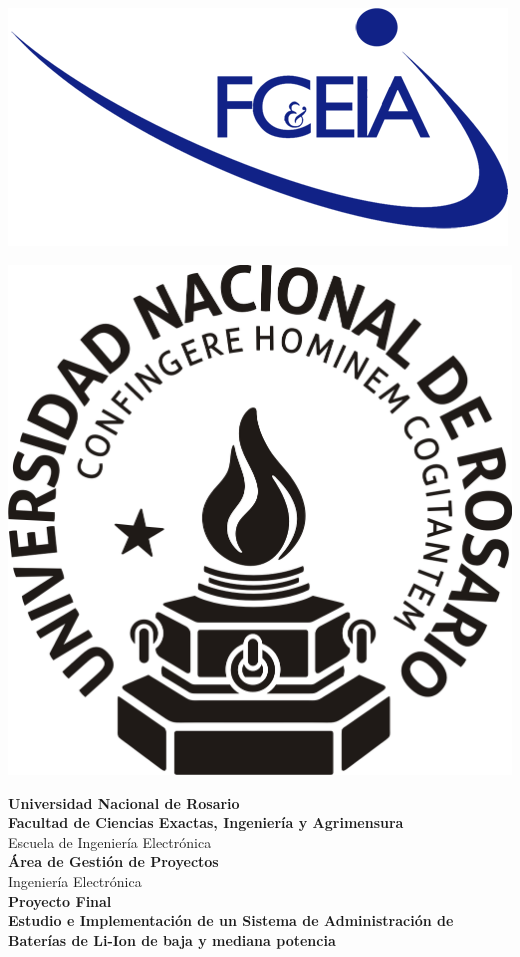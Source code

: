 \documentclass[10pt,a4paper]{article}
\begin{document}
\begin{titlepage}
    \begin{center}
	\begin{minipage}{.45\textwidth}
	    \flushleft
	    \includegraphics[scale=0.25]{FCEIA-logo.png}
	\end{minipage}%
	\hspace{20mm}
	\begin{minipage}{.3\textwidth}
	    \flushleft
	    \includegraphics[scale=0.1]{LOGO-UNR-NEGRO.png}
	\end{minipage}

	\vspace{15mm}

	\large{ \textbf{Universidad Nacional de Rosario}} \\[5mm]
	\textbf{Facultad de Ciencias Exactas, Ingeniería y Agrimensura} \\[5mm]
	Escuela de Ingeniería Electrónica \\[20mm]
	\Large {\textbf{Área de Gestión de Proyectos}}\\[1.5mm]
	\small {Ingeniería Electrónica} \\[20mm]
	\Large {\textbf{Proyecto Final}} \\[5mm]
	\Large{ \textbf{Estudio e Implementación de un Sistema de Administración de
	Baterías de Li-Ion de baja y mediana potencia}} \\[15mm]


\end{center}
\end{titlepage}
\end{document}
